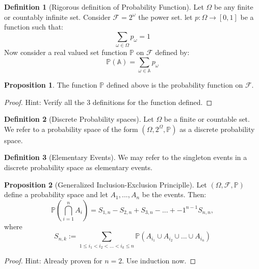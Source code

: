 \documentclass[11pt]{article}
\theoremstyle{definition}
\newtheorem{defn}{Definition}
\newtheorem{prop}{Proposition}[section]
\begin{document}
\begin{defn}[Rigorous definition of Probability Function] Let $\Omega$ be any finite or countably infinite set. Consider $\mathcal{F} = 2^{\omega}$ the power set. let $p: \Omega \rightarrow [0, 1]$ be a function such that:
$$
\sum_{\omega \in \Omega} p_{\omega} = 1
$$
Now consider a real valued set function $\mathbb{P}$ on $\mathcal{F}$ defined by:
$$
\mathbb{P}(\mathbb{A}) = \sum_{\omega \in \mathbb{A}} p_{\omega}
$$
\end{defn}

\begin{prop}
The function $\mathbb{P}$  defined above is the probability function on $\mathcal{F}$.
\end{prop}
\begin{proof}
Hint: Verify all the 3 definitions for the function defined. 
\end{proof}

\begin{defn}[Discrete Probability spaces]
Let $\Omega$ be a finite or countable set. We refer to a probability space of the form $(\Omega, 2^{\Omega} , \mathbb{P})$ as a discrete probability space.
\end{defn}

\begin{defn}[Elementary Events]
We may refer to the singleton events in a discrete probability space as elementary events.
\end{defn}

\begin{prop}[Generalized Inclusion-Exclusion Principlle]
Let $(\Omega, \mathcal{F}, \mathbb{P})$ define a probability space and let $A_1,...,A_n$ be the events. Then:
$$
\mathbb{P}(\bigcap_{i=1}^n A_i) = S_{1,n}-S_{2,n}+S_{3,n}-...+{-1}^{n-1}S_{n,n},
$$
where
$$
S_{n,k} := \sum _{1\leq i_1 <i_2<...<i_k\leq n} \mathbb{P}(A_{i_1} \cup A_{i_2} \cup ... \cup A_{i_n})
$$
\end{prop}
\begin{proof}
Hint: Already proven for $n=2$. Use induction  now.
\end{proof}
\end{document}
